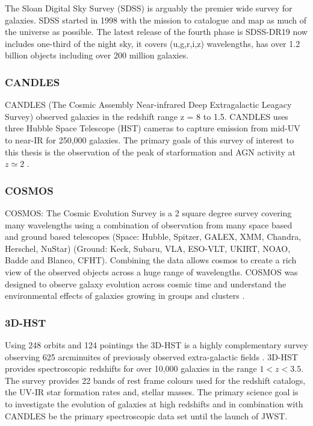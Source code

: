 The Sloan Digital Sky Survey (SDSS) is arguably the premier wide survey for galaxies. SDSS started in 1998 with the mission to catalogue and map as much of the universe as possible. The latest release of the fourth phase is SDSS-DR19 \citep{AhumadaDamsted61} now includes one-third of the night sky, it covers (u,g,r,i,z) wavelengths, has over 1.2 billion objects including over 200 million galaxies.

\subsubsection{CANDLES}
CANDLES (The Cosmic Assembly Near-infrared Deep Extragalactic Leagacy Survey) observed galaxies in the redshift range z = 8 to 1.5. CANDLES uses three Hubble Space Telescope (HST) cameras to capture emission from mid-UV to near-IR for 250,000 galaxies. The primary goals of this survey of interest to this thesis is the observation of the peak of starformation and AGN activity at $z \simeq 2$ \cite{Grogin2011Candels:Survey}.

\subsubsection{COSMOS}

COSMOS: The Cosmic Evolution Survey is a 2 square degree survey covering many wavelengths using a combination of observation from many space based and ground based telescopes (Space: Hubble, Spitzer, GALEX, XMM, Chandra, Herschel, NuStar) (Ground: Keck, Subaru, VLA, ESO-VLT, UKIRT, NOAO, Badde and Blanco, CFHT). Combining the data allows cosmos to create a rich view of the observed objects across a huge range of wavelengths. COSMOS was designed to observe galaxy evolution across cosmic time and understand the environmental effects of galaxies growing in groups and clusters \citep{HomeCOSMOS}.

\subsubsection{3D-HST}

Using 248 orbits and 124 pointings the 3D-HST is a highly complementary survey observing 625 arcminuites of previously observed extra-galactic fields \citep{Brammer20123D-HST:Telescope}. 3D-HST provides spectroscopic redshifts for over 10,000 galaxies in the range $1 < z < 3.5$. The survey provides 22 bands of rest frame colours used for the redshift catalogs, the UV-IR star formation rates and, stellar masses. The primary science goal is to investigate the evolution of galaxies at high redshifts and in combination with CANDLES be the primary spectroscopic data set until the launch of JWST.

